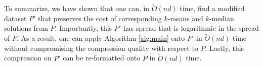 To summarize, we have shown that one can, in $\tilde{O}(nd)$ time, find a modified dataset $P'$ that preserves the cost of corresponding $k$-means and
$k$-median solutions from $P$. Importantly, this $P'$ has spread that is logarithmic in the spread of $P$. As a result, one can apply Algorithm \ref{alg:main}
onto $P'$ in $\tilde{O}(nd)$ time without compromising the compression quality with respect to $P$. Lastly, this compression on $P'$ can be re-formatted onto
$P$ in $\tilde{O}(nd)$ time.
